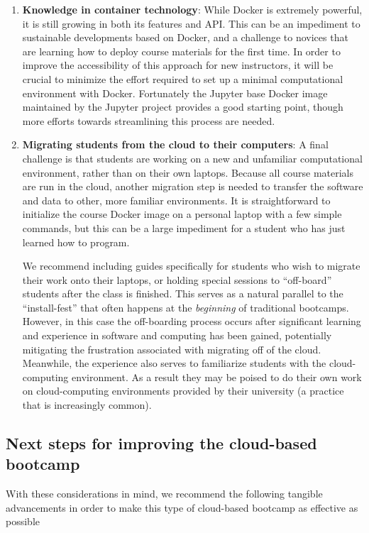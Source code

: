 \begin{enumerate}
\item {\bf Knowledge in container technology}: While Docker is extremely powerful,
it is still growing in both its features and API. This can be an impediment to
sustainable developments based on Docker, and a challenge to novices that are
learning how to deploy course materials for the first time. In order to improve
the accessibility of this approach for new instructors, it will be crucial to
minimize the effort required to set up a minimal computational environment with
Docker. Fortunately the Jupyter base Docker image maintained by the Jupyter
project provides a good starting point, though more efforts towards streamlining
this process are needed.

\item {\bf Migrating students from the cloud to their computers}: A final
challenge is that students are working on a new and
unfamiliar computational environment, rather than on their own laptops. Because
all course materials are run in the cloud, another migration step is
needed to transfer the software and data to other, more familiar environments.
It is straightforward to initialize the course Docker image on a
personal laptop with a
few simple commands, but this can be a large impediment for a student who has
just learned how to program.

We recommend including guides specifically for
students who wish to migrate their work onto their laptops, or holding special
sessions to ``off-board'' students after the class is finished. This serves as a
natural parallel to the ``install-fest'' that often happens at the
\emph{beginning} of traditional bootcamps. However, in this case the
off-boarding process occurs after significant learning and experience in
software and computing has been gained, potentially mitigating the frustration
associated with migrating off of the cloud. Meanwhile, the experience also
serves to familiarize students with the cloud-computing environment. As a result
they may be poised to do their own work on cloud-computing environments
provided by their university (a practice that is increasingly common).

\end{enumerate}

\subsection{Next steps for improving the cloud-based bootcamp}

With these considerations in mind, we recommend the following tangible
advancements in order to make this type of cloud-based bootcamp as effective
as possible

